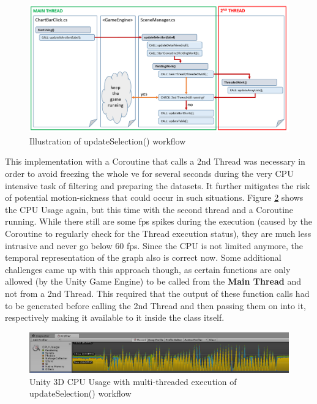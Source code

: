 \begin{figure}[t]
	\begin{center}
		\includegraphics[width=15cm]{03_Figures/08_Development/UpdateSelection.png}
		\caption{Illustration of updateSelection() workflow}
		\label{fig:unityupdateselection}
	\end{center}
\end{figure}
This implementation with a Coroutine that calls a 2nd Thread was necessary in order to avoid freezing the whole \gls{ve} for several seconds during the very CPU intensive task of filtering and preparing the datasets. It further mitigates the risk of potential motion-sickness that could occur in such situations. Figure \ref{fig:unityprofilemulti} shows the CPU Usage again, but this time with the second thread and a Coroutine running. While there still are some \gls{fps} spikes during the execution (caused by the Coroutine to regularly check for the Thread execution status), they are much less intrusive and never go below 60 \gls{fps}. Since the CPU is not limited anymore, the temporal representation of the graph also is correct now. \newline
Some additional challenges came up with this approach though, as certain functions are only allowed (by the Unity Game Engine) to be called from the \textbf{Main Thread} and not from a 2nd Thread. This required that the output of these function calls had to be generated before calling the 2nd Thread and then passing them on into it, respectively making it available to it inside the class itself.
\begin{figure}[b]
	\begin{center}
		\includegraphics[width=15cm]{03_Figures/08_Development/CPU_Usage_Multithreaded.png}
		\caption{Unity 3D CPU Usage with multi-threaded execution of updateSelection() workflow}
		\label{fig:unityprofilemulti}
	\end{center}
\end{figure}


